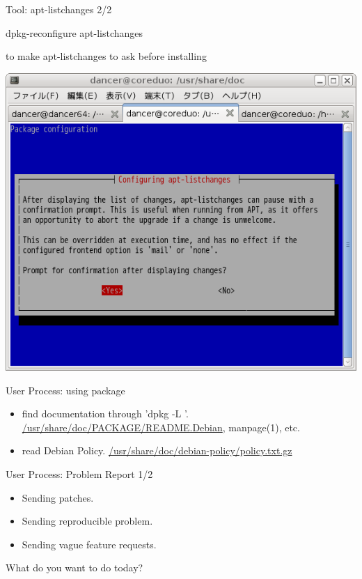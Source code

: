 \documentclass[cjk,dvipdfmx,12pt]{beamer}
\begin{document}
\begin{frame}[containsverbatim]{Tool: apt-listchanges 2/2}
 \begin{minipage}{0.49\hsize}

 \begin{commandline}
  dpkg-reconfigure apt-listchanges
 \end{commandline} 
 to make apt-listchanges to ask before installing

 \includegraphics[width=1\hsize]{image200805/apt-listchanges-qa.png}
 \end{minipage}
\end{frame}

\begin{frame}{User Process: using package}
\begin{itemize}
 \item find documentation through 'dpkg -L '.
       \url{/usr/share/doc/PACKAGE/README.Debian}, manpage(1), etc.
 \item read Debian Policy. 
       \url{/usr/share/doc/debian-policy/policy.txt.gz}
\end{itemize}
\end{frame}

\begin{frame}{User Process: Problem Report 1/2}
\begin{itemize}
 \item Sending patches.
 \item Sending reproducible problem.
 \item Sending vague feature requests.
\end{itemize}

What do you want to do today?
\end{frame}
\end{document}
